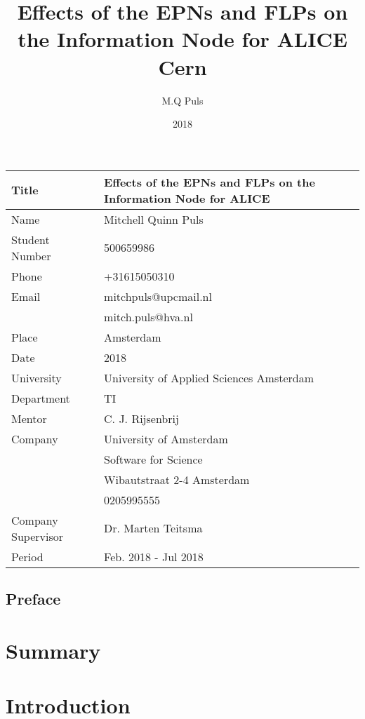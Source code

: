\documentclass{report}
\title{Effects of the EPNs and FLPs on the Information Node for ALICE\\Cern}
\author{M.Q Puls}
\date{2018}
\begin{document}
\maketitle

\newpage

\begin{tabular}{| l | l |}
\hline
Title & Effects of the EPNs and FLPs on the Information Node for ALICE \\ \hline
Name & Mitchell Quinn Puls \\ \hline
Student Number & 500659986 \\ \hline
Phone & +31615050310 \\ \hline
Email & mitchpuls@upcmail.nl \\ & mitch.puls@hva.nl \\ \hline
Place & Amsterdam \\ \hline
Date & 2018 \\ \hline
University & University of Applied Sciences Amsterdam \\ \hline
Department & TI \\ \hline
Mentor & C. J. Rijsenbrij \\ \hline
Company & University of Amsterdam \\ & Software for Science \\ & Wibautstraat 2-4 Amsterdam \\ & 0205995555 \\ \hline
Company Supervisor & Dr. Marten Teitsma \\ \hline
Period & Feb. 2018 - Jul 2018 \\ 
\hline
\end{tabular}

\newpage

\section*{Preface}

\newpage

\tableofcontents

\newpage

\chapter{Summary}

\newpage

\chapter{Introduction}
\end{document}
